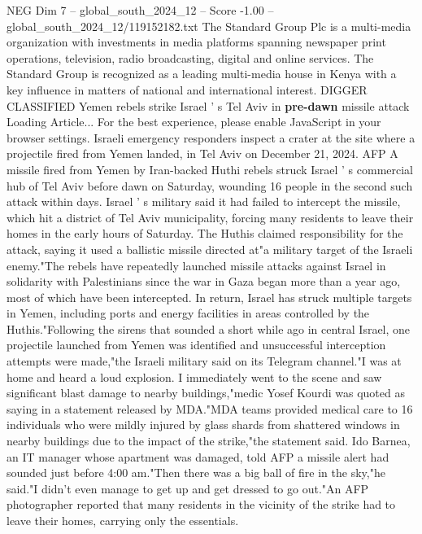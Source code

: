 \begin{textsample}{NEG Dim 7 – global\_south\_2024\_12 – Score -1.00 – global\_south\_2024\_12/119152182.txt}  \label{ex:f7_neg_103}
The Standard Group Plc is a multi-media organization with investments in media platforms spanning newspaper print operations, television, radio broadcasting, digital and online services.
The Standard Group is recognized as a leading multi-media house in Kenya with a key influence in matters of national and international interest.
DIGGER CLASSIFIED Yemen rebels strike Israel ' s Tel Aviv in \textbf{pre-dawn} missile attack Loading Article...
For the best experience, please enable JavaScript in your browser settings.
Israeli emergency responders inspect a crater at the site where a projectile fired from Yemen landed, in Tel Aviv on December 21, 2024.
AFP A missile fired from Yemen by Iran-backed Huthi rebels struck Israel ' s commercial hub of Tel Aviv before dawn on Saturday, wounding 16 people in the second such attack within days.
Israel ' s military said it had failed to intercept the missile, which hit a district of Tel Aviv municipality, forcing many residents to leave their homes in the early hours of Saturday.
The Huthis claimed responsibility for the attack, saying it used a ballistic missile directed at"a military target of the Israeli enemy."The rebels have repeatedly launched missile attacks against Israel in solidarity with Palestinians since the war in Gaza began more than a year ago, most of which have been intercepted.
In return, Israel has struck multiple targets in Yemen, including ports and energy facilities in areas controlled by the Huthis."Following the sirens that sounded a short while ago in central Israel, one projectile launched from Yemen was identified and unsuccessful interception attempts were made,"the Israeli military said on its Telegram channel."I was at home and heard a loud explosion.
I immediately went to the scene and saw significant blast damage to nearby buildings,"medic Yosef Kourdi was quoted as saying in a statement released by MDA."MDA teams provided medical care to 16 individuals who were mildly injured by glass shards from shattered windows in nearby buildings due to the impact of the strike,"the statement said.
Ido Barnea, an IT manager whose apartment was damaged, told AFP a missile alert had sounded just before 4:00 am."Then there was a big ball of fire in the sky,"he said."I didn't even manage to get up and get dressed to go out."An AFP photographer reported that many residents in the vicinity of the strike had to leave their homes, carrying only the essentials.

\end{textsample}
